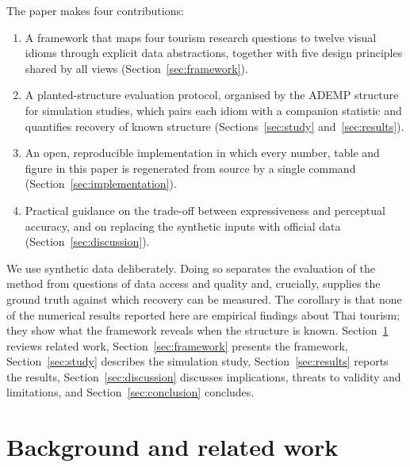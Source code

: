 \documentclass{article}
\begin{document}
The paper makes four contributions:
\begin{enumerate}[label=(C\arabic*),leftmargin=3em]
  \item A framework that maps four tourism research questions to twelve visual idioms through explicit data
        abstractions, together with five design principles shared by all views (Section~\ref{sec:framework}).
  \item A planted-structure evaluation protocol, organised by the ADEMP structure for simulation studies, which
        pairs each idiom with a companion statistic and quantifies recovery of known structure
        (Sections~\ref{sec:study} and~\ref{sec:results}).
  \item An open, reproducible implementation in which every number, table and figure in this paper is
        regenerated from source by a single command (Section~\ref{sec:implementation}).
  \item Practical guidance on the trade-off between expressiveness and perceptual accuracy, and on replacing
        the synthetic inputs with official data (Section~\ref{sec:discussion}).
\end{enumerate}

We use synthetic data deliberately. Doing so separates the evaluation of the method from questions of data
access and quality and, crucially, supplies the ground truth against which recovery can be measured. The
corollary is that none of the numerical results reported here are empirical findings about Thai tourism;
they show what the framework reveals when the structure is known. Section~\ref{sec:related} reviews related
work, Section~\ref{sec:framework} presents the framework, Section~\ref{sec:study} describes the simulation
study, Section~\ref{sec:results} reports the results, Section~\ref{sec:discussion} discusses implications,
threats to validity and limitations, and Section~\ref{sec:conclusion} concludes.

\section{Background and related work}\label{sec:related}
\end{document}
